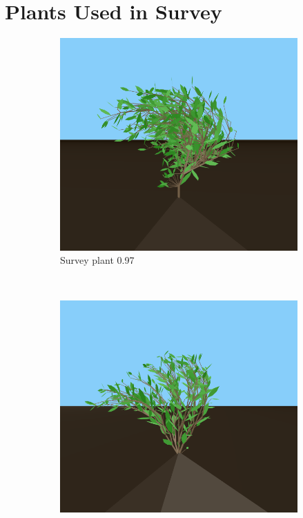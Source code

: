 \chapter{Plants Used in Survey}
\label{app:survey-plants}

\begin{figure}
    \centering
    \begin{subfigure}{0.48\textwidth}
        \includegraphics[width=\textwidth]{figures/plant-97}
        \caption{Survey plant 0.97}
    \end{subfigure}
    ~
    \begin{subfigure}{0.48\textwidth}
        \includegraphics[width=\textwidth]{figures/plant-91}

\end{subfigure}
\end{figure}
